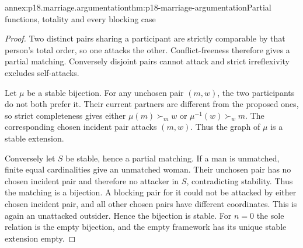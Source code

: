 \begin{annexitem}{annex:p18.marriage.argumentation}{thm:p18-marriage-argumentation}{Partial functions, totality and every blocking case}
\begin{proof}
Two distinct pairs sharing a participant
are strictly comparable by that person's
total order, so one attacks the other.
Conflict-freeness therefore gives a
partial matching. Conversely disjoint
pairs cannot attack and strict
irreflexivity excludes self-attacks.

Let \(\mu\) be a stable bijection.
For any unchosen pair \((m,w)\),
the two participants do not both
prefer it. Their current partners
are different from the proposed
ones, so strict completeness gives
either \(\mu(m)\succ_m w\) or
\(\mu^{-1}(w)\succ_w m\).
The corresponding chosen incident
pair attacks \((m,w)\).
Thus the graph of \(\mu\)
is a stable extension.

Conversely let \(S\) be stable,
hence a partial matching.
If a man is unmatched,
finite equal cardinalities
give an unmatched woman.
Their unchosen pair has
no chosen incident pair
and therefore no attacker
in \(S\), contradicting
stability. Thus the
matching is a bijection.
A blocking pair for it
could not be attacked
by either chosen incident
pair, and all other
chosen pairs have different
coordinates. This is again
an unattacked outsider.
Hence the bijection is
stable. For \(n=0\)
the sole relation is
the empty bijection,
and the empty framework
has its unique stable
extension empty.
\end{proof}
\end{annexitem}

